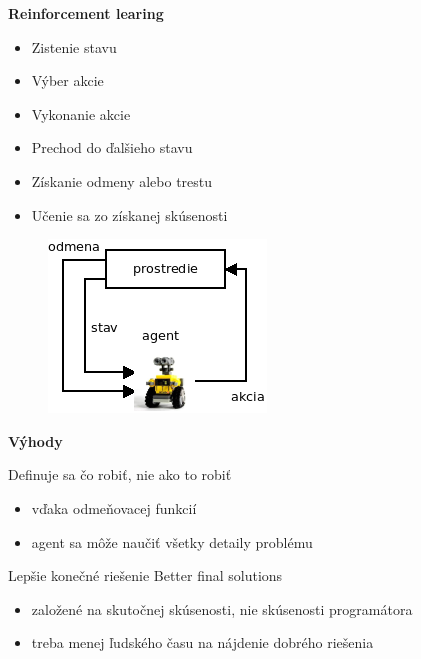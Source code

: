 \documentclass[xcolor=dvipsnames]{beamer}
\begin{document}
\begin{frame}{\bf Reinforcement learing}

\begin{minipage}{.5\textwidth}

\begin{itemize}
  \item Zistenie stavu
  \item Výber akcie
  \item Vykonanie akcie
  \item Prechod do ďalšieho stavu
  \item Získanie odmeny alebo trestu
  \item Učenie sa zo získanej skúsenosti
\end{itemize}

  \end{minipage}%
\begin{minipage}{.5\textwidth}

  \begin{figure}[!htb]
  \centering
  \includegraphics[scale=.8]{../diagrams/agent.png}
  \end{figure}

\end{minipage}

\end{frame}

\begin{frame}{\bf Výhody}

Definuje sa čo robiť, nie ako to robiť
\begin{itemize}
\item vďaka odmeňovacej funkcií
\item agent sa môže naučiť všetky detaily problému
\end{itemize}

Lepšie konečné riešenie
Better final solutions
\begin{itemize}
\item založené na skutočnej skúsenosti, nie skúsenosti programátora
\item treba menej ľudského času na nájdenie dobrého riešenia
\end{itemize}


\end{frame}
\end{document}
